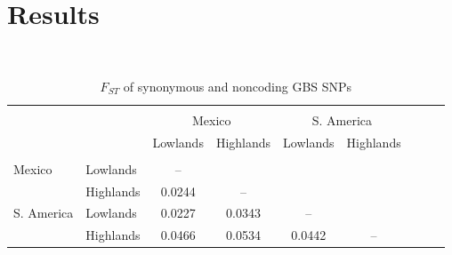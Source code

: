 \section*{Results}

\renewcommand{\arraystretch}{1.1}
\begin{table}[tb]

\begin{center}
 \caption[]{$F_{ST}$ of synonymous and noncoding GBS SNPs}
  \textbf{}\\[-2mm]
{\fontsize{7}{9}\sf
    \begin{tabular}{llccccccl}
    \hline
    & & \\[-3mm]
	&		&	\multicolumn{2}{c}{Mexico}		&	\multicolumn{2}{c}{S. America}		\\
	&		&	Lowlands	&	Highlands	&	Lowlands	&	Highlands	\\
      \hline
    & & \\[-3mm]
Mexico	&	Lowlands	&	--		&			&			&		\\
		&	Highlands	&	0.0244	&	--		&			&		\\
S. America		&	Lowlands	&	0.0227	&	0.0343	&	--		&		\\
		&	Highlands	&	0.0466	&	0.0534	&	0.0442	&	--	\\ [1mm]
    \hline
    \end{tabular}
    \label{FstP}  %
}
\end{center}
\end{table}
\renewcommand{\arraystretch}{1}

